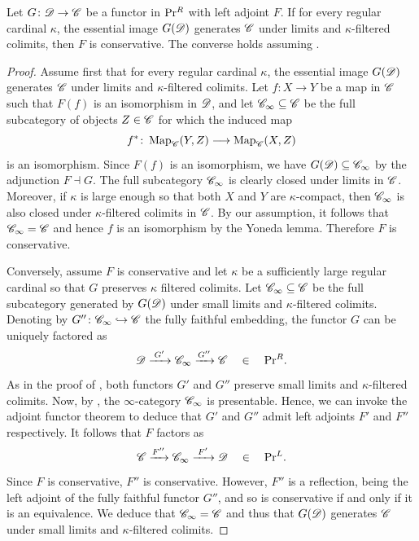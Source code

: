 \documentclass[12pt]{article}
\begin{document}
\begin{prop}\label{PrR_Epi_Mono}
    Let $G\colon \mathscr{D} \to \mathscr{C}$ be a functor in $\mathrm{Pr}{}^R$ with left adjoint $F$. If for every regular cardinal $\kappa$, the essential image $G(\mathscr{D})$ generates $\mathscr{C}$ under limits and $\kappa$-filtered colimits, then $F$ is conservative. The converse holds assuming .
\end{prop}
\begin{proof}
    Assume first that for every regular cardinal $\kappa$, the essential image $G(\mathscr{D})$ generates $\mathscr{C}$ under limits and $\kappa$-filtered colimits. Let $f\colon X \to Y$ be a map in $\mathscr{C}$ such that $F(f)$ is an isomorphism in $\mathscr{D}$, and let $\mathscr{C}_\infty\subseteq \mathscr{C}$ be the full subcategory of objects $Z\in\mathscr{C}$ for which the induced map 
    \[
        f^*\colon \operatorname{Map}_{\mathscr{C}}(Y,Z) \longrightarrow \operatorname{Map}_{\mathscr{C}}(X,Z)
    \]
    is an isomorphism. Since $F(f)$ is an isomorphism, we have $G(\mathscr{D})\subseteq \mathscr{C}_\infty$ by the adjunction $F\dashv G$. The full subcategory $\mathscr{C}_\infty$ is clearly closed under limits in $\mathscr{C}$. Moreover, if $\kappa$ is large enough so that both $X$ and $Y$ are $\kappa$-compact, then $\mathscr{C}_\infty$ is also closed under $\kappa$-filtered colimits in $\mathscr{C}$. By our assumption, it follows that $\mathscr{C}_\infty = \mathscr{C}$ and hence $f$ is an isomorphism by the Yoneda lemma. Therefore $F$ is conservative.
    
    Conversely, assume $F$ is conservative and let $\kappa$ be a sufficiently large regular cardinal so that $G$ preserves $\kappa$ filtered colimits. Let $\mathscr{C}_\infty \subseteq \mathscr{C}$ be the full subcategory generated by $G(\mathscr{D})$ under small limits and $\kappa$-filtered colimits. Denoting by $G''\colon \mathscr{C}_\infty \hookrightarrow \mathscr{C}$ the fully faithful embedding, the functor $G$ can be uniquely factored as
    \[
        \mathscr{D}  \xrightarrow{\;G'\;} \mathscr{C}_\infty \xrightarrow{G''} \mathscr{C}
        \quad\in\quad \mathrm{Pr}{}^R.
    \] 
    As in the proof of , both functors $G'$ and $G''$ preserve small limits and $\kappa$-filtered colimits. Now, by , the $\infty$-category $\mathscr{C}_\infty$ is presentable. Hence, we can invoke the adjoint functor theorem to deduce that $G'$ and $G''$ admit left adjoints $F'$ and $F''$ respectively. It follows that $F$ factors as
    \[
        \mathscr{C} \xrightarrow{F''} \mathscr{C}_\infty \xrightarrow{\;F'\;} \mathscr{D}
        \quad\in\quad \mathrm{Pr}{}^L.
    \]
    Since $F$ is conservative, $F''$ is conservative. However, $F''$ is a reflection, being the left adjoint of the fully faithful functor $G''$, and so is conservative if and only if it is an equivalence. We deduce that $\mathscr{C}_\infty = \mathscr{C}$ and thus that $G(\mathscr{D})$ generates $\mathscr{C}$ under small limits and $\kappa$-filtered colimits.
\end{proof}
\end{document}
